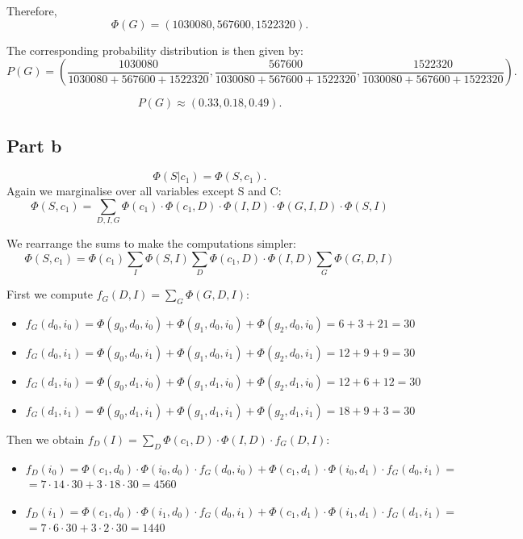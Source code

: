 \documentclass[11pt,a4paper]{article}
\begin{document}
	Therefore, $$ \Phi(G) = (1030080, 567600, 1522320). $$
	
	The corresponding probability distribution is then given by:
	$$ P(G) = \left(\frac{1030080}{1030080 + 567600 + 1522320}, \frac{567600}{1030080 + 567600 + 1522320}, \frac{1522320}{1030080 + 567600 + 1522320}\right). $$
	
	$$ P(G) \approx (0.33, 0.18, 0.49). $$
	
	\subsection*{Part b}
	$$ \Phi(S | c_1) = \Phi(S, c_1).$$
	Again we marginalise over all variables except S and C:
	$$ \Phi(S, c_1) = \sum_{D, I, G} \Phi(c_1) \cdot \Phi(c_1, D) \cdot \Phi(I, D) \cdot \Phi(G, I, D) \cdot \Phi(S, I)  $$
	
	We rearrange the sums to make the computations simpler:
	$$ \Phi(S, c_1) = \Phi(c_1) \sum_I \Phi(S, I) \sum_D \Phi(c_1, D) \cdot \Phi(I, D) \sum_G \Phi(G, D, I) $$
	
	First we compute  $ f_G(D, I) = \sum_G \Phi(G, D, I):$
	\begin{itemize}
		\item $ f_G(d_0, i_0) = \Phi(g_0, d_0, i_0) + \Phi(g_1, d_0, i_0) + \Phi(g_2, d_0, i_0) = 6 + 3 + 21 = 30$
		\item $ f_G(d_0, i_1) = \Phi(g_0, d_0, i_1) + \Phi(g_1, d_0, i_1) + \Phi(g_2, d_0, i_1) = 12 + 9 + 9 = 30$
		\item $ f_G(d_1, i_0) = \Phi(g_0, d_1, i_0) + \Phi(g_1, d_1, i_0) + \Phi(g_2, d_1, i_0) = 12 + 6 + 12 = 30$
		\item $ f_G(d_1, i_1) = \Phi(g_0, d_1, i_1) + \Phi(g_1, d_1, i_1) + \Phi(g_2, d_1, i_1) = 18 + 9 + 3 = 30$
	\end{itemize}
	
	Then we obtain $f_D(I) = \sum_D \Phi(c_1, D) \cdot \Phi(I, D) \cdot f_G(D, I):$
	\begin{itemize}
		\item $f_D(i_0) = \Phi(c_1, d_0) \cdot \Phi(i_0, d_0) \cdot f_G(d_0, i_0) + \Phi(c_1, d_1) \cdot \Phi(i_0, d_1) \cdot f_G(d_0, i_1) = $ \\
		$ = 7 \cdot 14 \cdot 30 + 3 \cdot 18 \cdot 30 = 4560 $
		\item $f_D(i_1) = \Phi(c_1, d_0) \cdot \Phi(i_1, d_0) \cdot f_G(d_0, i_1) + \Phi(c_1, d_1) \cdot \Phi(i_1, d_1) \cdot f_G(d_1, i_1) = $ \\
		$ = 7 \cdot 6 \cdot 30 + 3 \cdot 2 \cdot 30 = 1440 $
	\end{itemize}
	
\end{document}

